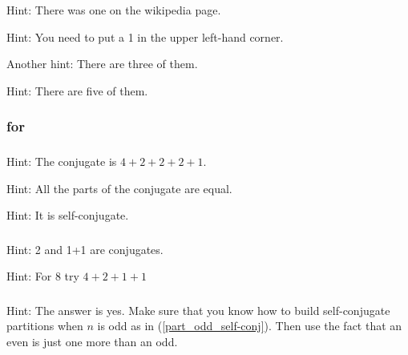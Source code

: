 \subsubsection*{ \answers}
\begin{apart}
    \item Hint: There was one on the wikipedia page.
    \item Hint: You need to put a 1 in the upper left-hand corner.
    \item Another hint: There are three of them.
    \item Hint: There are five of them.
\end{apart}

\subsubsection{\answers for  \subselfconj}

\subsubsection*{ \answers}
\begin{apart}
    \item Hint: The conjugate is $4+2+2+2+1$.
    \item Hint: All the parts of the conjugate are equal.
    \item Hint: It is self-conjugate.
\end{apart}

\subsubsection*{ \answers}
\begin{apart}
    \item Hint: 2 and 1+1 are conjugates.
    \item Hint: For 8 try $4+2+1+1$
\end{apart}

\subsubsection*{ \answers}
Hint: The answer is yes.  Make sure that you know how to build self-conjugate partitions when $n$ is odd as in  (\ref {part_odd_self-conj}). Then use the fact that an even is just one more than an odd.


